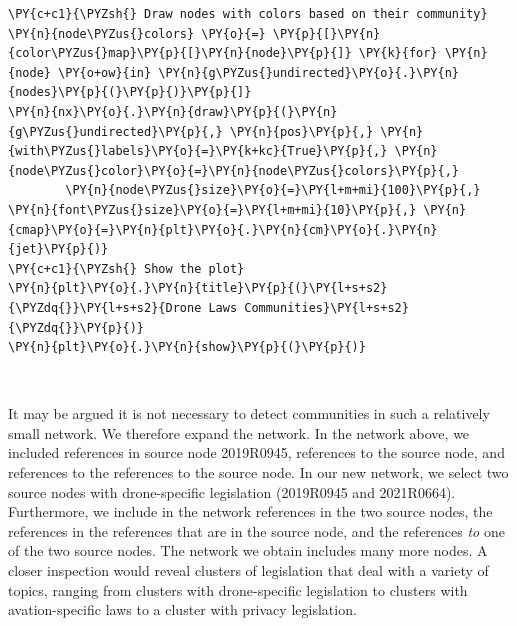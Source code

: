 \begin{tcolorbox}[breakable, size=fbox, boxrule=1pt, pad at break*=1mm,colback=cellbackground, colframe=cellborder]
\begin{Verbatim}[commandchars=\\\{\}]
\PY{c+c1}{\PYZsh{} Draw nodes with colors based on their community}
\PY{n}{node\PYZus{}colors} \PY{o}{=} \PY{p}{[}\PY{n}{color\PYZus{}map}\PY{p}{[}\PY{n}{node}\PY{p}{]} \PY{k}{for} \PY{n}{node} \PY{o+ow}{in} \PY{n}{g\PYZus{}undirected}\PY{o}{.}\PY{n}{nodes}\PY{p}{(}\PY{p}{)}\PY{p}{]}
\PY{n}{nx}\PY{o}{.}\PY{n}{draw}\PY{p}{(}\PY{n}{g\PYZus{}undirected}\PY{p}{,} \PY{n}{pos}\PY{p}{,} \PY{n}{with\PYZus{}labels}\PY{o}{=}\PY{k+kc}{True}\PY{p}{,} \PY{n}{node\PYZus{}color}\PY{o}{=}\PY{n}{node\PYZus{}colors}\PY{p}{,} 
        \PY{n}{node\PYZus{}size}\PY{o}{=}\PY{l+m+mi}{100}\PY{p}{,} \PY{n}{font\PYZus{}size}\PY{o}{=}\PY{l+m+mi}{10}\PY{p}{,} \PY{n}{cmap}\PY{o}{=}\PY{n}{plt}\PY{o}{.}\PY{n}{cm}\PY{o}{.}\PY{n}{jet}\PY{p}{)}
\PY{c+c1}{\PYZsh{} Show the plot}
\PY{n}{plt}\PY{o}{.}\PY{n}{title}\PY{p}{(}\PY{l+s+s2}{\PYZdq{}}\PY{l+s+s2}{Drone Laws Communities}\PY{l+s+s2}{\PYZdq{}}\PY{p}{)}
\PY{n}{plt}\PY{o}{.}\PY{n}{show}\PY{p}{(}\PY{p}{)}
\end{Verbatim}
\end{tcolorbox}

    \begin{center}
    \end{center}
    { \hspace*{\fill} \\}
    
    It may be argued it is not necessary to detect communities in such a
relatively small network. We therefore expand the network. In the
network above, we included references in source node 2019R0945,
references to the source node, and references to the references to the
source node. In our new network, we select two source nodes with
drone-specific legislation (2019R0945 and 2021R0664). Furthermore, we
include in the network references in the two source nodes, the
references in the references that are in the source node, and the
references \emph{to} one of the two source nodes. The network we obtain
includes many more nodes. A closer inspection would reveal clusters of
legislation that deal with a variety of topics, ranging from clusters
with drone-specific legislation to clusters with avation-specific laws
to a cluster with privacy legislation.

